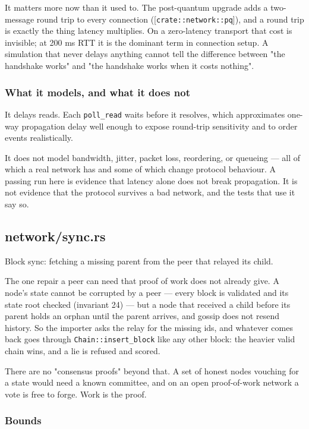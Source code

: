 \documentclass[11pt,a4paper]{article}
\begin{document}
It matters more now than it used to. The post-quantum upgrade adds a
two-message round trip to every connection ([\texttt{crate::network::pq}]), and a
round trip is exactly the thing latency multiplies. On a zero-latency
transport that cost is invisible; at 200 ms RTT it is the dominant term in
connection setup. A simulation that never delays anything cannot tell the
difference between "the handshake works" and "the handshake works when it
costs nothing".

\subsubsection{What it models, and what it does not}

It delays reads. Each \texttt{poll\_read} waits before it resolves, which
approximates one-way propagation delay well enough to expose round-trip
sensitivity and to order events realistically.

It does not model bandwidth, jitter, packet loss, reordering, or queueing —
all of which a real network has and some of which change protocol behaviour.
A passing run here is evidence that latency alone does not break
propagation. It is not evidence that the protocol survives a bad network,
and the tests that use it say so.

\subsection{network/sync.rs}
Block sync: fetching a missing parent from the peer that relayed its child.

The one repair a peer can need that proof of work does not already give.
A node's state cannot be corrupted by a peer — every block is validated and
its state root checked (invariant 24) — but a node that received a child
before its parent holds an orphan until the parent arrives, and gossip does
not resend history. So the importer asks the relay for the missing ids, and
whatever comes back goes through \texttt{Chain::insert\_block} like any other block:
the heavier valid chain wins, and a lie is refused and scored.

There are no "consensus proofs" beyond that. A set of honest nodes vouching
for a state would need a known committee, and on an open proof-of-work
network a vote is free to forge. Work is the proof.

\subsubsection{Bounds}
\end{document}
